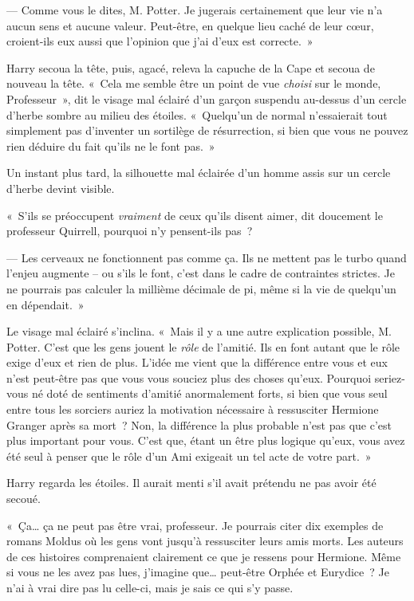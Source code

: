 --- Comme vous le dites, M. Potter. Je jugerais certainement que leur vie n'a aucun sens et aucune valeur. Peut-être, en quelque lieu caché de leur cœur, croient-ils eux aussi que l'opinion que j'ai d'eux est correcte.~»

Harry secoua la tête, puis, agacé, releva la capuche de la Cape et secoua de nouveau la tête. «~Cela me semble être un point de vue \emph{choisi} sur le monde, Professeur~», dit le visage mal éclairé d'un garçon suspendu au-dessus d'un cercle d'herbe sombre au milieu des étoiles. «~Quelqu'un de normal n'essaierait tout simplement pas d'inventer un sortilège de résurrection, si bien que vous ne pouvez rien déduire du fait qu'ils ne le font pas.~»

Un instant plus tard, la silhouette mal éclairée d'un homme assis sur un cercle d'herbe devint visible.

«~S'ils se préoccupent \emph{vraiment} de ceux qu'ils disent aimer, dit doucement le professeur Quirrell, pourquoi n'y pensent-ils pas~?

--- Les cerveaux ne fonctionnent pas comme ça. Ils ne mettent pas le turbo quand l'enjeu augmente -- ou s'ils le font, c'est dans le cadre de contraintes strictes. Je ne pourrais pas calculer la millième décimale de pi, même si la vie de quelqu'un en dépendait.~»

Le visage mal éclairé s'inclina. «~Mais il y a une autre explication possible, M. Potter. C'est que les gens jouent le \emph{rôle} de l'amitié. Ils en font autant que le rôle exige d'eux et rien de plus. L'idée me vient que la différence entre vous et eux n'est peut-être pas que vous vous souciez plus des choses qu'eux. Pourquoi seriez-vous né doté de sentiments d'amitié anormalement forts, si bien que vous seul entre tous les sorciers auriez la motivation nécessaire à ressusciter Hermione Granger après sa mort~? Non, la différence la plus probable n'est pas que c'est plus important pour vous. C'est que, étant un être plus logique qu'eux, vous avez été seul à penser que le rôle d'un Ami exigeait un tel acte de votre part.~»

Harry regarda les étoiles. Il aurait menti s'il avait prétendu ne pas avoir été secoué.

«~Ça… ça ne peut pas être vrai, professeur. Je pourrais citer dix exemples de romans Moldus où les gens vont jusqu'à ressusciter leurs amis morts. Les auteurs de ces histoires comprenaient clairement ce que je ressens pour Hermione. Même si vous ne les avez pas lues, j'imagine que… peut-être Orphée et Eurydice~? Je n'ai à vrai dire pas lu celle-ci, mais je sais ce qui s'y passe.


